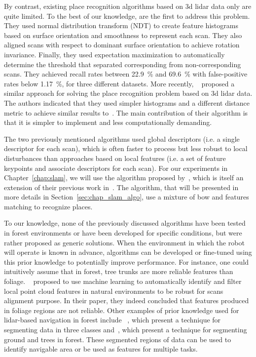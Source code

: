 By contrast, existing place recognition algorithms based on \gls*{3d} \gls*{lidar} data only are quite limited. To the best of our knowledge, \citet{Magnusson2009} are the first to address this problem. They used normal distribution transform (NDT) to create feature histograms based on surface orientation and smoothness to represent each scan. They also aligned scans with respect to dominant surface orientation to achieve rotation invariance. Finally, they used expectation maximization to automatically determine the threshold that separated corresponding from non-corresponding scans. They achieved recall rates between \SI{22.9}{\percent} and \SI{69.6}{\percent} with false-positive rates below \SI{1.17}{\percent}, for three different datasets. More recently, ~\citet{Mack2015} proposed a similar approach for solving the place recognition problem based on \gls*{3d} lidar data. The authors indicated that they used simpler histograms and a different distance metric to achieve similar results to~\citet{Magnusson2009}. The main contribution of their algorithm is that it is simpler to implement and less computationally demanding.

The two previously mentioned algorithms used global descriptors (i.e. a single descriptor for each scan), which is often faster to process but less robust to local disturbances than approaches based on local features (i.e. a set of feature keypoints and associate descriptors for each scan). For our experiments in Chapter~\ref{chap:slam}, we will use the algorithm proposed by~\citet{Steder2011b}, which is itself an extension of their previous work in~\citep{Steder2010}. The algorithm, that will be presented in more details in Section~\ref{sec:chap_slam_algo}, use a mixture of \gls*{bow} and features matching to recognize places.


To our knowledge, none of the previously discussed algorithms have been tested in forest environments or have been developed for specific conditions, but were rather proposed as generic solutions. When the environment in which the robot will operate is known in advance, algorithms can be developed or fine-tuned using this prior knowledge to potentially improve performance. For instance, one could intuitively assume that in forest, tree trunks are more reliable features than foliage. ~\citet{Latulippe2013} proposed to use machine learning to automatically identify and filter local point cloud features in natural environments to be robust for scans alignment purpose. In their paper, they indeed concluded that features produced in foliage regions are not reliable. Other examples of prior knowledge used for \gls*{lidar}-based navigation in forest include ~\citep{Lalonde2006}, which present a technique for segmenting data in three classes and~\citep{Mcdaniel2012}, which present a technique for segmenting ground and trees in forest. These segmented regions of data can be used to identify navigable area or be used as features for multiple tasks.

